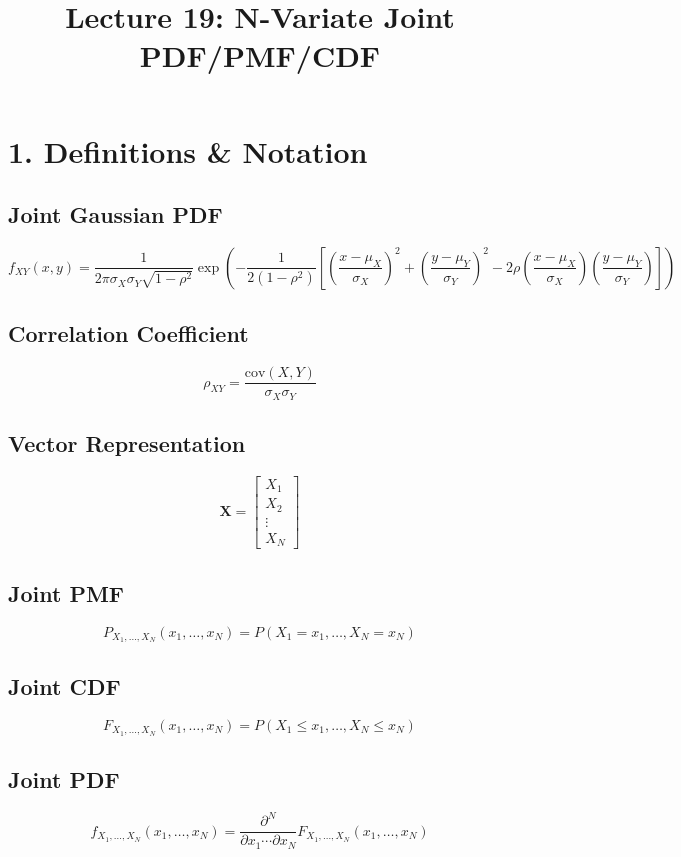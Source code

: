 \documentclass[12pt]{article}
\title{Lecture 19: N-Variate Joint PDF/PMF/CDF}
\author{}
\date{}
\begin{document}
\maketitle

\section*{1. Definitions \& Notation}

\subsection*{Joint Gaussian PDF}
\[
f_{XY}(x,y)=\frac{1}{2\pi\sigma_X\sigma_Y\sqrt{1-\rho^2}}
\exp\left(
-\frac{1}{2(1-\rho^2)}\left[
\left(\frac{x-\mu_X}{\sigma_X}\right)^2
+\left(\frac{y-\mu_Y}{\sigma_Y}\right)^2
-2\rho\left(\frac{x-\mu_X}{\sigma_X}\right)\left(\frac{y-\mu_Y}{\sigma_Y}\right)
\right]
\right)
\]

\subsection*{Correlation Coefficient}
\[
\rho_{XY} = \frac{\text{cov}(X,Y)}{\sigma_X \sigma_Y}
\]

\subsection*{Vector Representation}
\[
\mathbf{X} =
\begin{bmatrix}
X_1\\
X_2\\
\vdots\\
X_N
\end{bmatrix}
\]

\subsection*{Joint PMF}
\[
P_{X_1,\dots,X_N}(x_1,\dots,x_N)
= P(X_1=x_1,\dots,X_N=x_N)
\]

\subsection*{Joint CDF}
\[
F_{X_1,\dots,X_N}(x_1,\dots,x_N)
= P(X_1 \le x_1,\dots,X_N \le x_N)
\]

\subsection*{Joint PDF}
\[
f_{X_1,\dots,X_N}(x_1,\dots,x_N)
=
\frac{\partial^N}{\partial x_1 \cdots \partial x_N}
F_{X_1,\dots,X_N}(x_1,\dots,x_N)
\]
\end{document}
